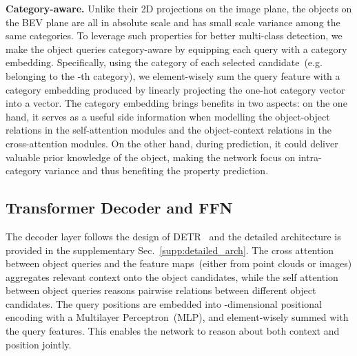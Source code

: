\noindent\textbf{Category-aware.}  
Unlike the{ir} 2D projections on the image plane, the objects on the BEV plane are all in absolute scale and has small scale variance 
among the same categories. To leverage such properties for better multi-class detection, we make the object queries category-aware by equipping each query with a category embedding. Specifically, using the category of each selected candidate~(e.g.  {belonging} to the -th category), we element-wisely sum the query feature with a category embedding produced by linearly projecting the one-hot category vector into a  vector. The category embedding brings benefits {in} two aspects: on {the} one hand, it serves as a useful side information when modelling the object-object relations in {the self-attention 
modules}
and the object-context relations in {the cross-attention modules.}
On the other hand, during prediction, it could deliver valuable prior knowledge of the object, making the network {focus} on intra-category variance and {thus} benefiting the property prediction. 
















\subsection{Transformer Decoder and FFN} 




\noindent The decoder layer follows the {design} of DETR~\cite{misra20213detr} 
and the detailed architecture is provided in the supplementary Sec.~\ref{supp:detailed_arch}.
The cross attention between object queries and the feature maps~(either from point clouds or images) aggregates relevant context onto the object candidates, while the self attention between object queries reasons pairwise relations between different object candidates. The query positions are embedded into -dimensional positional encoding with a Multilayer Perceptron~(MLP), {and element-wisely summed with the query features}. This enables the network to reason about both context and position jointly. 

